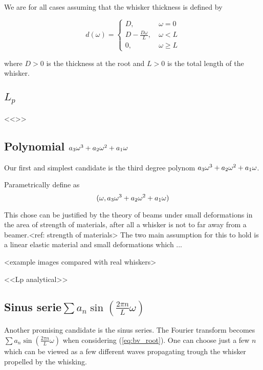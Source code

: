 We are for all cases assuming that the whisker thickness is defined by

\begin{equation}
    d(\omega) = \begin{cases}
        D,~& \omega=0\\
        D-\frac{D\omega}{L},~& \omega<L\\
        0,~& \omega\ge L
    \end{cases}
\end{equation}

where $D>0$ is the thickness at the root and $L>0$ is the total length of the
whisker.


\subsection{$L_p$}
    <<>>

\subsection{Polynomial $a_3\omega^3+a_2\omega^2+a_1\omega$}

    Our first and simplest candidate is the third degree polynom $a_3\omega^3+a_2\omega^2+a_1\omega$.

    Parametrically define as
    \begin{equation}
        (\omega,a_3\omega^3+a_2\omega^2+a_1\omega)
    \end{equation}

    This chose can be justified by the theory of beams under small deformations 
    in the area of strength of materials, after all a whisker is not to far 
    away from a beamer.<ref: strength of materials> The two main assumption
    for this to hold is a linear elastic material and small deformations which
    ...

    <example images compared with real whiskers>

    <<Lp analytical>>

\subsection{Sinus serie$\sum{a_n\sin (\frac{2\pi n}{L}\omega)}$}
    Another promising candidate is the sinus series.
    The Fourier transform becomes $\sum{a_n\sin (\frac{2\pi n}{L}\omega)}$ when
    considering (\ref{eq:bv_root}). One can choose just a few $n$ which can be
    viewed as a few different waves propagating trough the whisker propelled by
    the whisking. 

